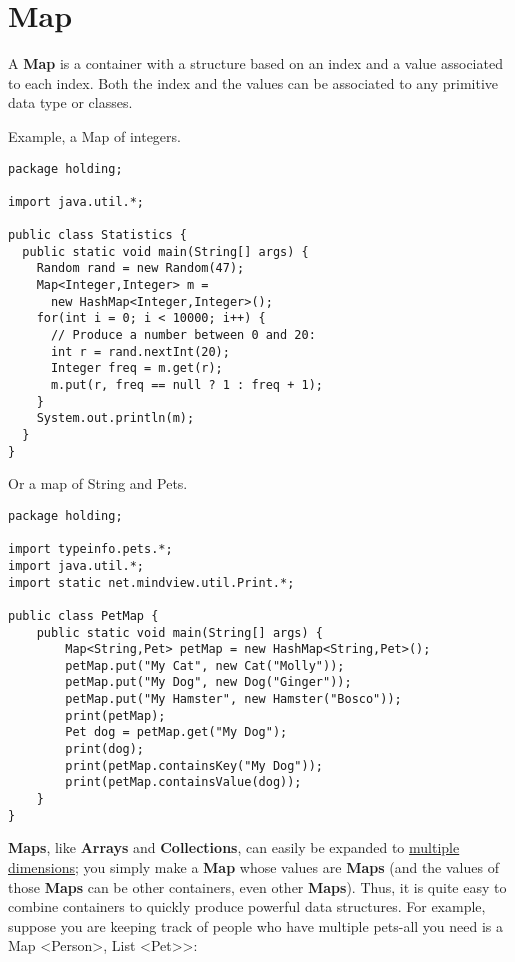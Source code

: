 \documentclass[10pt,letterpaper]{report}
\begin{document}
\section{Map}
A \textbf{Map} is a container with a structure based on an index and a value associated to each index. Both the index and the values can be associated to any primitive data type or classes.

Example, a Map of  integers.

\begin{lstlisting}
package holding;

import java.util.*;

public class Statistics {
  public static void main(String[] args) {
    Random rand = new Random(47);
    Map<Integer,Integer> m =
      new HashMap<Integer,Integer>();
    for(int i = 0; i < 10000; i++) {
      // Produce a number between 0 and 20:
      int r = rand.nextInt(20);
      Integer freq = m.get(r);
      m.put(r, freq == null ? 1 : freq + 1);
    }
    System.out.println(m);
  }
}
\end{lstlisting}

Or a map of String and Pets.

\begin{lstlisting}
package holding;

import typeinfo.pets.*;
import java.util.*;
import static net.mindview.util.Print.*;

public class PetMap {
	public static void main(String[] args) {
		Map<String,Pet> petMap = new HashMap<String,Pet>();
		petMap.put("My Cat", new Cat("Molly"));
		petMap.put("My Dog", new Dog("Ginger"));
		petMap.put("My Hamster", new Hamster("Bosco"));
		print(petMap);
		Pet dog = petMap.get("My Dog");
		print(dog);
		print(petMap.containsKey("My Dog"));
		print(petMap.containsValue(dog));
	}
}
\end{lstlisting}

\textbf{Maps}, like \textbf{Arrays} and \textbf{Collections}, can easily be expanded to \underline{multiple} \underline{dimensions}; you simply make a \textbf{Map} whose values are \textbf{Maps} (and the values of those \textbf{Maps} can be other containers, even other \textbf{Maps}). Thus, it is quite easy to combine containers to quickly produce powerful data structures. For example, suppose you are keeping track of people who have multiple pets-all you need is a Map \textless Person\textgreater, List \textless Pet\textgreater\textgreater :
\end{document}
